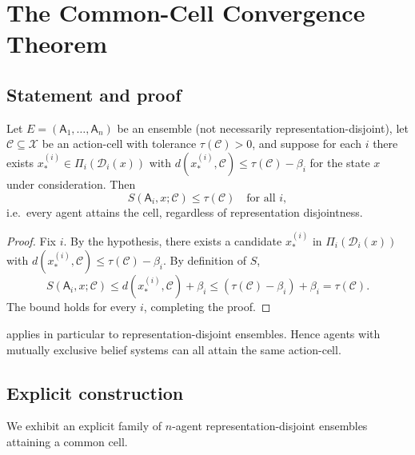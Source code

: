 \documentclass[11pt,a4paper]{article}
\newcommand{\D}{\mathcal{D}}
\newcommand{\X}{\mathcal{X}}
\newcommand{\Cell}{\mathcal{C}}
\newcommand{\agent}{\mathsf{A}}
\begin{document}
\section{The Common-Cell Convergence Theorem}
\label{sec:ccc}

\subsection{Statement and proof}

\begin{theorem}\label{thm:ccc}
Let $E=(\agent_1,\dots,\agent_n)$ be an ensemble (not necessarily
representation-disjoint), let $\Cell\subseteq\X$ be an action-cell with
tolerance $\tau(\Cell)>0$, and suppose for each $i$ there exists
$x_*^{(i)}\in\Pi_i(\D_i(x))$ with $d(x_*^{(i)},\Cell)\le\tau(\Cell)
-\beta_i$ for the state $x$ under consideration. Then
\[
S(\agent_i,x;\Cell)\le\tau(\Cell)\quad\text{for all }i,
\]
i.e.\ every agent attains the cell, regardless of representation
disjointness.
\end{theorem}

\begin{proof}
Fix $i$. By the hypothesis, there exists a candidate $x_*^{(i)}$ in
$\Pi_i(\D_i(x))$ with $d(x_*^{(i)},\Cell)\le\tau(\Cell)-\beta_i$. By
definition of $S$,
\[
S(\agent_i,x;\Cell)\le d(x_*^{(i)},\Cell)+\beta_i\le
(\tau(\Cell)-\beta_i)+\beta_i=\tau(\Cell).
\]
The bound holds for every $i$, completing the proof.
\end{proof}

\begin{corollary}
\label{cor:cell-coord}
 applies in particular to representation-disjoint
ensembles. Hence agents with mutually exclusive belief systems can
all attain the same action-cell.
\end{corollary}

\subsection{Explicit construction}

We exhibit an explicit family of $n$-agent representation-disjoint
ensembles attaining a common cell.
\end{document}
